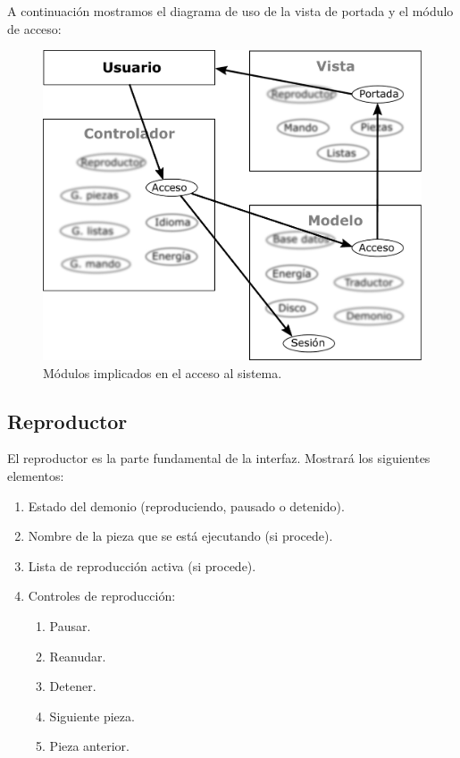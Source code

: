 A continuación mostramos el diagrama de uso de la vista de portada y el módulo de acceso:

\smallskip

\begin{figure}[H]
	\noindent \begin{centering}
		\includegraphics[width=\linewidth/2]{capitulo4/mvc_acceso}
		\par\end{centering}
	\smallskip
	\caption{\label{fig:mvc_acceso} Módulos implicados en el acceso al sistema.}
\end{figure} 

\smallskip

\subsection{Reproductor}

El reproductor es la parte fundamental de la interfaz. Mostrará los siguientes elementos:

\begin{enumerate}
	\item Estado del demonio (reproduciendo, pausado o detenido).
	\item Nombre de la pieza que se está ejecutando (si procede).
	\item Lista de reproducción activa (si procede).
	\item Controles de reproducción:
	
	\begin{enumerate}
		\item Pausar.
		\item Reanudar.
		\item Detener.
		\item Siguiente pieza.
		\item Pieza anterior.
	\end{enumerate}
\end{enumerate}

